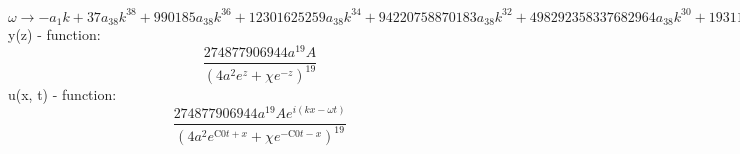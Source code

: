\documentclass[12pt,a4paper,draft]{article}
\begin{document}
$\omega \to -a_{1} k+37 a_{38} k^{38}+990185 a_{38} k^{36}+12301625259 a_{38} k^{34}+94220758870183 a_{38} k^{32}+498292358337682964 a_{38} k^{30}+1931171178444968232612 a_{38} k^{28}+5680688080121515872073500 a_{38} k^{26}+12959919020381504864863814220 a_{38} k^{24}+23230145549407157920919575263510 a_{38} k^{22}+32934738807323028248562499135054990 a_{38} k^{20}+36988380546760426412824415158483087418 a_{38} k^{18}+32795461048065018778246452750615592158210 a_{38} k^{16}+22756737256642577769393589484659399540903876 a_{38} k^{14}+12169263344729598527106585620346220467109285652 a_{38} k^{12}+4891434808612774094307239140283449679373631055436 a_{38} k^{10}+1418898843679355315097637595744917119717168354213948 a_{38} k^8+276541694346598646935910794466772881724668720898886125 a_{38} k^6+31155530889692726751063732177333127215255445489521020625 a_{38} k^4+1196241465964139900364910073696949298887059808189231421875 a_{38} k^2-63556507121367137779949401940445729623290288217882431640625 a_{38}$\\


y(z) - function:
$$
\frac{274877906944 a^{19} A}{\left(4 a^2 e^z+\chi  e^{-z}\right)^{19}}
$$
u(x, t) - function:
$$
\frac{274877906944 a^{19} A e^{i (k x-\omega  t)}}{\left(4 a^2 e^{\text{C0} t+x}+\chi  e^{-\text{C0} t-x}\right)^{19}}
$$
\end{document}
